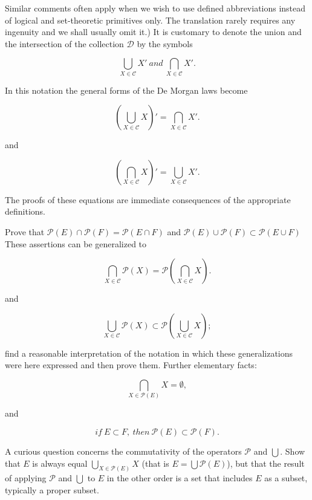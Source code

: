 Similar comments often apply when we wish to use defined abbreviations instead of logical and set-theoretic primitives only. The translation rarely requires any ingenuity and we shall usually omit it.) It is customary to denote the union and the intersection of the collection $ \mathcal{D} $ by the symbols  

\begin{equation*}
\bigcup_{X \in \mathcal{C}} X' \: and \: \bigcap_{X \in \mathcal{C}} X' .
\end{equation*}

In this notation the general forms of the De Morgan laws become 

\begin{equation*}
( \bigcup_{X \in \mathcal{C}} X)' = \bigcap_{X \in \mathcal{C}} X' .
\end{equation*}

and 

\begin{equation*}
( \bigcap_{X \in \mathcal{C}} X)' = \bigcup_{X \in \mathcal{C}} X' .
\end{equation*}

The proofs of these equations are immediate consequences of the appropriate definitions. 

\begin{exercise} Prove that $ \mathcal{P} (E) \cap \mathcal{P} (F) = \mathcal{P}(E \cap F) $ and $ \mathcal{P} (E) \cup \mathcal{P} (F) \subset \mathcal{P}(E \cup F) $ These assertions can be generalized to 

\begin{equation*}
\bigcap_{X \in \mathcal{C}} \mathcal{P} (X) = \mathcal{P} ( \bigcap_{X \in \mathcal{C}} X) .
\end{equation*}

and

\begin{equation*}
\bigcup_{X \in \mathcal{C}} \mathcal{P} (X) \subset \mathcal{P} ( \bigcup_{X \in \mathcal{C}} X) ;
\end{equation*}

find a reasonable interpretation of the notation in which these generalizations were here expressed and then prove them. Further  elementary facts: 

\begin{equation*}
\bigcap_{X \in \mathcal{P} (E)} X = \emptyset ,
\end{equation*}

and 

\begin{equation*}
if \: E \subset F , \: then \: \mathcal{P} (E) \subset \mathcal{P} (F).
\end{equation*}

A curious question concerns the commutativity of the operators $ \mathcal{P} $ and $ \bigcup $. Show that $E$ is always equal $\bigcup_{X \in \mathcal{P} (E)} X $ (that is $ E = \bigcup \mathcal{P} (E) $), but that the result of applying $\mathcal{P} $ and $ \bigcup $ to $E$ in the other order is a set that includes $E$ as a subset, typically a proper subset.
\end{exercise}